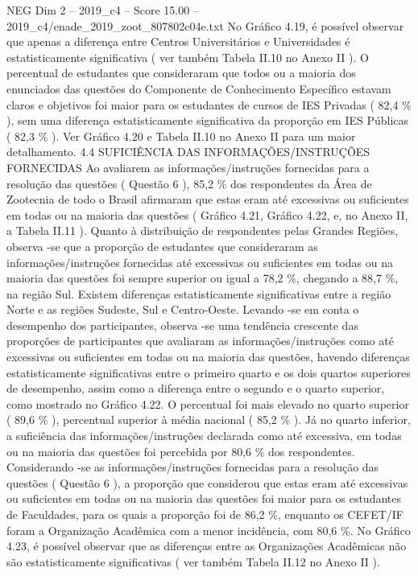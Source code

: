 \begin{textsample}{NEG Dim 2 – 2019\_c4 – Score 15.00 – 2019\_c4/enade\_2019\_zoot\_807802c04e.txt}
No Gráfico 4.19, é possível observar que apenas a diferença entre Centros Universitários e Universidades é estatisticamente significativa ( ver também Tabela II.10 no Anexo II ).
O percentual de estudantes que consideraram que todos ou a maioria dos enunciados das questões do Componente de Conhecimento Específico estavam claros e objetivos foi maior para os estudantes de cursos de IES Privadas ( 82,4 \% ), sem uma diferença estatisticamente significativa da proporção em IES Públicas ( 82,3 \% ).
Ver Gráfico 4.20 e Tabela II.10 no Anexo II para um maior detalhamento. 4.4 SUFICIÊNCIA DAS INFORMAÇÕES/INSTRUÇÕES FORNECIDAS Ao avaliarem as informações/instruções fornecidas para a resolução das questões ( Questão 6 ), 85,2 \% dos respondentes da Área de Zootecnia de todo o Brasil afirmaram que estas eram até excessivas ou suficientes em todas ou na maioria das questões ( Gráfico 4.21, Gráfico 4.22, e, no Anexo II, a Tabela II.11 ).
Quanto à distribuição de respondentes pelas Grandes Regiões, observa -se que a proporção de estudantes que consideraram as informações/instruções fornecidas até excessivas ou suficientes em todas ou na maioria das questões foi sempre superior ou igual a 78,2 \%, chegando a 88,7 \%, na região Sul.
Existem diferenças estatisticamente significativas entre a região Norte e as regiões Sudeste, Sul e Centro-Oeste.
Levando -se em conta o desempenho dos participantes, observa -se uma tendência crescente das proporções de participantes que avaliaram as informações/instruções como até excessivas ou suficientes em todas ou na maioria das questões, havendo diferenças estatisticamente significativas entre o primeiro quarto e os dois quartos superiores de desempenho, assim como a diferença entre o segundo e o quarto superior, como mostrado no Gráfico 4.22.
O percentual foi mais elevado no quarto superior ( 89,6 \% ), percentual superior à média nacional ( 85,2 \% ).
Já no quarto inferior, a suficiência das informações/instruções declarada como até excessiva, em todas ou na maioria das questões foi percebida por 80,6 \% dos respondentes.
Considerando -se as informações/instruções fornecidas para a resolução das questões ( Questão 6 ), a proporção que considerou que estas eram até excessivas ou suficientes em todas ou na maioria das questões foi maior para os estudantes de Faculdades, para os quais a proporção foi de 86,2 \%, enquanto os CEFET/IF foram a Organização Acadêmica com a menor incidência, com 80,6 \%.
No Gráfico 4.23, é possível observar que as diferenças entre as Organizações Acadêmicas não são estatisticamente significativas ( ver também Tabela II.12 no Anexo II ).

\end{textsample}

